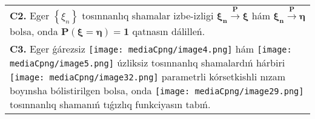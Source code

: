 \documentclass{article}
\begin{document}
\begin{tabular}{m{17cm}}
 \\
\textbf{C2.} Eger \(\left\{ \xi_{n} \right\}\) tosınnanlıq shamalar izbe-izligi \(\mathbf{\xi}_{\mathbf{n}}\overset{\mathbf{P}}{\rightarrow}\mathbf{\xi}\) hám \(\mathbf{\xi}_{\mathbf{n}}\overset{\mathbf{P}}{\rightarrow}\mathbf{\eta}\) bolsa, onda \(\mathbf{P}\left( \mathbf{\xi = \eta} \right)\mathbf{=}\mathbf{1}\) qatnasın dálilleń.
 \\
\textbf{C3.} Eger ǵárezsiz \texttt{[image: mediaCpng/image4.png]} hám \texttt{[image: mediaCpng/image5.png]} úzliksiz tosınnanlıq shamalardıń hárbiri \texttt{[image: mediaCpng/image32.png]} parametrli kórsetkishli nızam boyınsha bólistirilgen bolsa, onda \texttt{[image: mediaCpng/image29.png]} tosınnanlıq shamanıń tıǵızlıq funkciyasın tabıń.
 \\

\end{tabular}
\vspace{1cm}
\end{document}
